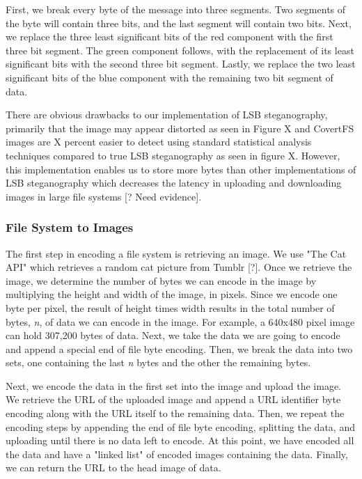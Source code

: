 First, we break every byte of the message into three segments. Two segments of the byte will contain three bits, and the last segment will contain two bits. Next, we replace the three least significant bits of the red component with the first three bit segment. The green component follows, with the replacement of its least significant bits with the second three bit segment. Lastly, we replace the two least significant bits of the blue component with the remaining two bit segment of data. 

There are obvious drawbacks to our implementation of LSB steganography, primarily that the image may appear distorted as seen in Figure X and CovertFS images are X percent easier to detect using standard statistical analysis techniques compared to true LSB steganography as seen in figure X. However, this implementation enables us to store more bytes than other implementations of LSB steganography which decreases the latency in uploading and downloading images in large file systems [? Need evidence].
 
\subsubsection{File System to Images}

The first step in encoding a file system is retrieving an image. We use "The Cat API" which retrieves a random cat picture from Tumblr [?]. Once we retrieve the image, we determine the number of bytes we can encode in the image by multiplying the height and width of the image, in pixels. Since we encode one byte per pixel, the result of height times width results in the total number of bytes, \textit{n}, of data we can encode in the image. For example, a 640x480 pixel image can hold 307,200 bytes of data. Next, we take the data we are going to encode and append a special end of file byte encoding. Then, we break the data into two sets, one containing the last \textit{n} bytes and the other the remaining bytes. 

Next, we encode the data in the first set into the image and upload the image. We retrieve the URL of the uploaded image and append a URL identifier byte encoding along with the URL itself to the remaining data. Then, we repeat the encoding steps by appending the end of file byte encoding, splitting the data, and uploading until there is no data left to encode. At this point, we have encoded all the data and have a "linked list" of encoded images containing the data. Finally, we can return the URL to the head image of data. 